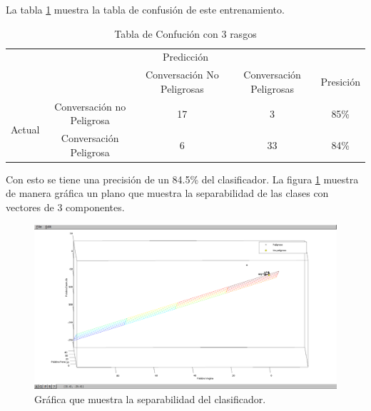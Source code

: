 La tabla \ref{tab:confucion1} muestra la tabla de confusi\'on de este entrenamiento.


\begin{table}[h]
\begin{center}
\begin{tabular}{c|c|c|c|c|}
\multicolumn{5}{c}{Predicci\'on} \\
\cline{2-5}
& & Conversaci\'on No Peligrosas & Conversaci\'on Peligrosas &  Presici\'on \\
\cline{2-5}
\multirow{2}{*}{Actual} & Conversaci\'on no Peligrosa & 17 & 3 & 85\% \\
\cline{2-5}
& Conversaci\'on Peligrosa &  6 & 33 & 84\% \\
\cline{2-5}

\end{tabular}
\caption{Tabla de Confuci\'on con 3 rasgos}
\label{tab:confucion1}
\end{center}
\end{table}

Con esto se tiene una precisi\'on de un 84.5\% del clasificador.
La figura \ref{fig:separabilidad} muestra de manera gr\'afica un plano que muestra la separabilidad de las clases con vectores de 3 componentes.

\begin{figure}
	\begin{center}
	\includegraphics[scale=.4]{images/separavilidad}
	\caption{Gr\'afica que muestra la separabilidad del clasificador.}
	\label{fig:separabilidad}
	\end{center}
\end{figure}


